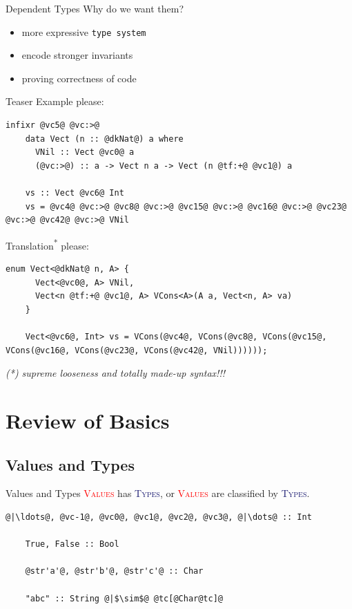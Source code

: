 \documentclass[xcolor={usenames,dvipsnames}]{beamer}
\newcommand{\htycon}[1]{\textcolor{MidnightBlue}{\textsc{#1}}}
\newcommand{\hvalcon}[1]{\textcolor{Red}{\textsc{#1}}}
\begin{document}
\begin{frame}[fragile]{Dependent Types}
  Why do we want them?
  \begin{itemize}
    \item more expressive \texttt{type system}
    \item encode stronger invariants
    \item proving correctness of code
  \end{itemize}
\end{frame}

\begin{frame}[fragile]{Teaser}
  Example please:
  \begin{lstlisting}[style=hask]
    infixr @vc5@ @vc:>@
    data Vect (n :: @dkNat@) a where
      VNil :: Vect @vc0@ a
      (@vc:>@) :: a -> Vect n a -> Vect (n @tf:+@ @vc1@) a

    vs :: Vect @vc6@ Int
    vs = @vc4@ @vc:>@ @vc8@ @vc:>@ @vc15@ @vc:>@ @vc16@ @vc:>@ @vc23@ @vc:>@ @vc42@ @vc:>@ VNil
  \end{lstlisting}

  Translation\textsuperscript{*} please:
  \begin{lstlisting}[style=hask]
    enum Vect<@dkNat@ n, A> {
      Vect<@vc0@, A> VNil,
      Vect<n @tf:+@ @vc1@, A> VCons<A>(A a, Vect<n, A> va)
    }

    Vect<@vc6@, Int> vs = VCons(@vc4@, VCons(@vc8@, VCons(@vc15@, VCons(@vc16@, VCons(@vc23@, VCons(@vc42@, VNil))))));
  \end{lstlisting}
  \textit{\tiny{(*) supreme looseness and totally made-up syntax!!!}}
\end{frame}


\section{Review of Basics}

\subsection{Values and Types}

\begin{frame}[fragile]{Values and Types}
  \hvalcon{Values} has \htycon{Types}, or \hvalcon{Values} are classified by \htycon{Types}.\\

  \begin{lstlisting}[style=hask]
    @|\ldots@, @vc-1@, @vc0@, @vc1@, @vc2@, @vc3@, @|\dots@ :: Int

    True, False :: Bool

    @str'a'@, @str'b'@, @str'c'@ :: Char

    "abc" :: String @|$\sim$@ @tc[@Char@tc]@
  \end{lstlisting}
\end{frame}
\end{document}
